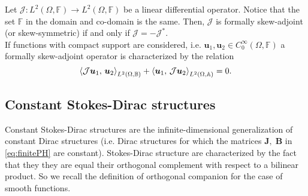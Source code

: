 \begin{definition}
	\label{def:skewoper}
	Let $\mathcal{J}: L^2(\Omega, \mathbb{F}) \rightarrow L^2(\Omega, \mathbb{F})$ be a linear differential operator. Notice that the set $\mathbb{F}$ in the domain and co-domain is the same. Then, $\mathcal{J}$ is formally skew-adjoint (or skew-symmetric) if and only if $\mathcal{J} = -\mathcal{J}^*$. \\
	
	If functions with compact support are considered, i.e. $\bm{u}_1, \bm{u}_2 \in  C^{\infty}_0(\Omega, \mathbb{F})$ a formally skew-adjoint operator is characterized by the relation 
	\begin{equation}
	\inner[L^2(\Omega, \bbB)]{\mathcal{J}\bm{u}_1}{\bm{u}_2} + \inner[L^2(\Omega, \bbA)]{\bm{u}_1}{\mathcal{J}\bm{u}_2} = 0.
	\end{equation}{}
\end{definition}

\subsection{Constant Stokes-Dirac structures}

Constant Stokes-Dirac structures are the infinite-dimensional generalization of constant Dirac structures (i.e. Dirac structures for which the matrices $\mathbf{J}, \; \mathbf{B}$ in \eqref{eq:finitePH} are constant). Stokes-Dirac structure are characterized by the fact that they they are equal their orthogonal complement with respect to a bilinear product. So we recall the definition of orthogonal companion for the case of smooth functions.

